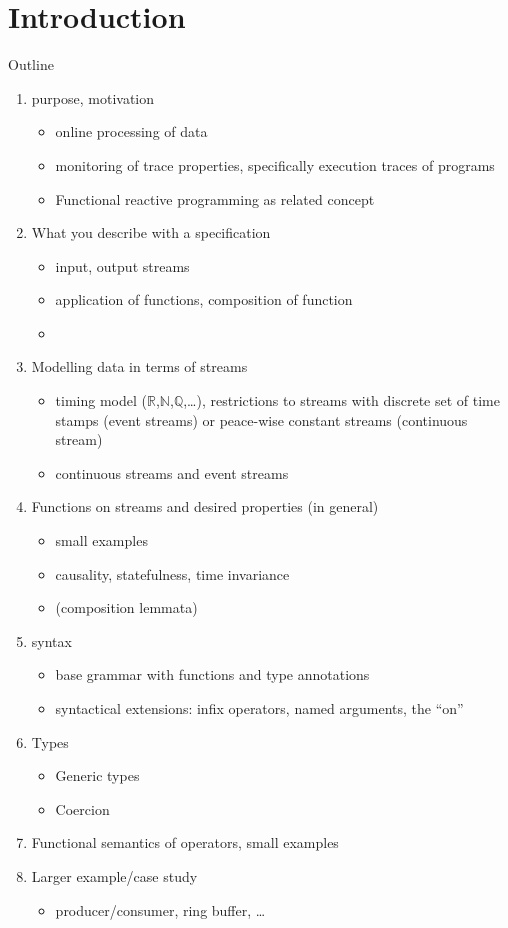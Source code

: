 \section{Introduction}

Outline

\begin{enumerate}
  \item purpose, motivation
  \begin{itemize}
    \item online processing of data
    \item monitoring of trace properties, specifically execution traces of programs
    \item Functional reactive programming as related concept
  \end{itemize}
  \item What you describe with a \tessla specification
  \begin{itemize}    
    \item input, output streams
    \item application of functions, composition of function
    \item 
  \end{itemize}
  \item Modelling data in terms of streams
  \begin{itemize}
    \item timing model ($ℝ$,$ℕ$,$ℚ$,…), restrictions to streams with discrete set of time stamps (event streams) or peace-wise constant streams (continuous stream)
    \item continuous streams and event streams    
   \end{itemize}
   \item Functions on streams and desired properties (in general)
   \begin{itemize}
     \item small examples
     \item causality, statefulness, time invariance 
     \item (composition lemmata)
   \end{itemize}
   \item \tessla syntax
   \begin{itemize}
      \item base grammar with functions and type annotations
      \item syntactical extensions: infix operators, named arguments, the “on”
   \end{itemize}
   \item Types
   \begin{itemize}
     \item Generic types
     \item Coercion 
   \end{itemize}
   \item Functional semantics of operators, small examples
   \item Larger example/case study
   \begin{itemize}
     \item producer/consumer, ring buffer, …
   \end{itemize}
   

\end{enumerate}
